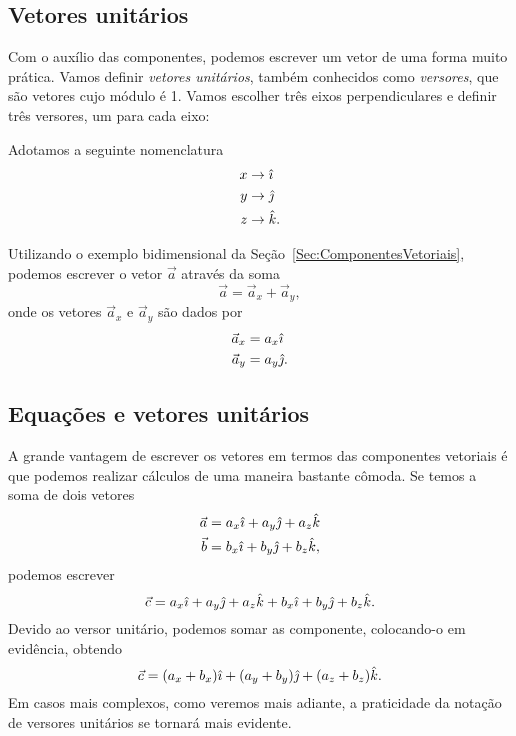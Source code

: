 \subsection{Vetores unitários}

Com o auxílio das componentes, podemos escrever um vetor de uma forma muito prática. Vamos definir \emph{vetores unitários}, também conhecidos como \emph{versores}, que são vetores cujo módulo é 1. Vamos escolher três eixos perpendiculares e definir três versores, um para cada eixo:


\noindent{}Adotamos a seguinte nomenclatura
\begin{align}
  x &\to \hat{\imath} \\
  y &\to \hat{\jmath} \\
  z &\to \hat{k}.
\end{align}

Utilizando o exemplo bidimensional da Seção~\ref{Sec:ComponentesVetoriais}, podemos escrever o vetor $\vec{a}$ através da soma
\begin{equation}
  \vec{a} = \vec{a}_x + \vec{a}_y,
\end{equation}
%
onde os vetores $\vec{a}_x$ e $\vec{a}_y$ são dados por
\begin{align}
  \vec{a}_x &= a_x \hat{\imath} \\
  \vec{a}_y &= a_y \hat{\jmath}.
\end{align}

\subsection{Equações e vetores unitários}

A grande vantagem de escrever os vetores em termos das componentes vetoriais é que podemos realizar cálculos de uma maneira bastante cômoda. Se temos a soma de dois vetores 
\begin{align}
  \vec{a} &= a_x \hat{\imath} + a_y \hat{\jmath} + a_z \hat{k} \\
  \vec{b} &= b_x \hat{\imath} + b_y \hat{\jmath} + b_z \hat{k},
\end{align}
%
podemos escrever
\begin{equation}
  \vec{c} = a_x \hat{\imath} + a_y \hat{\jmath} + a_z \hat{k} + b_x \hat{\imath} + b_y \hat{\jmath} + b_z \hat{k}.
\end{equation}
%
Devido ao versor unitário, podemos somar as componente, colocando-o em evidência, obtendo
\begin{equation}
  \vec{c} = (a_x + b_x) \hat{\imath} + (a_y + b_y) \hat{\jmath} + (a_z + b_z)\hat{k}.
\end{equation}
%
Em casos mais complexos, como veremos mais adiante, a praticidade da notação de versores unitários se tornará mais evidente.
